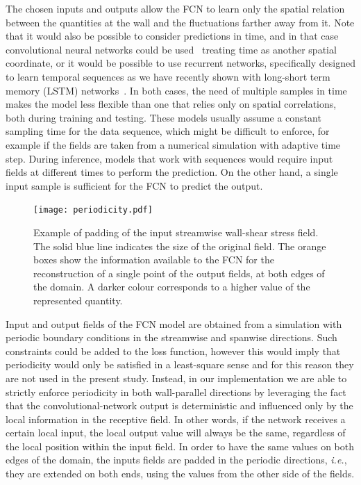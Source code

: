 The chosen inputs and outputs allow the FCN to learn only the spatial relation between the quantities at the wall and the fluctuations farther away from it.
Note that it would also be possible to consider predictions in time, and in that case convolutional neural networks could be used~\citep{oord2016wavenet} treating time as another spatial coordinate, or it would be possible to use recurrent networks, specifically designed to learn temporal sequences as we have recently shown with long-short term memory (LSTM) networks~\citep{srinivasan2019predictions,guastoni2019use}.
In both cases, the need of multiple samples in time makes the model less flexible than one that relies only on spatial correlations, both during training and testing.
These models usually assume a constant sampling time for the data sequence, which might be difficult to enforce, for example if the fields are taken from a numerical simulation with adaptive time step.
During inference, models that work with sequences would require input fields at different times to perform the prediction. On the other hand, a single input sample is sufficient for the FCN to predict the output.
\begin{figure}
\begin{center}
\texttt{[image: periodicity.pdf]}
\end{center}
\caption{\label{fig:periodicity} Example of padding of the input streamwise wall-shear stress field. The solid blue line indicates the size of the original field. The orange boxes show the information available to the FCN for the reconstruction of a single point of the output fields, at both edges of the domain. A darker colour corresponds to a higher value of the represented quantity.}
\end{figure}
Input and output fields of the FCN model are obtained from a simulation with periodic boundary conditions in the streamwise and spanwise directions.
Such constraints could be added to the loss function, however this would imply that periodicity would only be satisfied in a least-square sense and for this reason they are not used in the present study.
Instead, in our implementation we are able to strictly enforce periodicity in both wall-parallel directions by leveraging the fact that the convolutional-network output is deterministic and influenced only by the local information in the receptive field.
In other words, if the network receives a certain local input, the local output value will always be the same, regardless of the local position within the input field.
In order to have the same values on both edges of the domain, the inputs fields are padded in the periodic directions, {\it i.e.}, they are extended on both ends, using the values from the other side of the fields.

